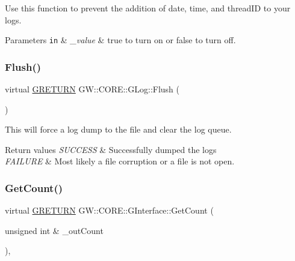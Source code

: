 Use this function to prevent the addition of date, time, and thread\+ID to your logs.


\begin{DoxyParams}[1]{Parameters}
\mbox{\tt in}  & {\em \+\_\+value} & true to turn on or false to turn off. \\
\hline
\end{DoxyParams}
\hypertarget{class_g_w_1_1_c_o_r_e_1_1_g_log_a1e0bb42d95ddd42fa019d5cd6050ff97}{}\label{class_g_w_1_1_c_o_r_e_1_1_g_log_a1e0bb42d95ddd42fa019d5cd6050ff97} 
\subsubsection{\texorpdfstring{Flush()}{Flush()}}
{\footnotesize\ttfamily virtual \hyperlink{namespace_g_w_a69b1aaebac1cac8049825f035884c95b}{G\+R\+E\+T\+U\+RN} G\+W\+::\+C\+O\+R\+E\+::\+G\+Log\+::\+Flush (\begin{DoxyParamCaption}{ }\end{DoxyParamCaption})\hspace{0.3cm}{\ttfamily [pure virtual]}}

This will force a log dump to the file and clear the log queue.


\begin{DoxyRetVals}{Return values}
{\em S\+U\+C\+C\+E\+SS} & Successfully dumped the logs \\
\hline
{\em F\+A\+I\+L\+U\+RE} & Most likely a file corruption or a file is not open. \\
\hline
\end{DoxyRetVals}
\hypertarget{class_g_w_1_1_c_o_r_e_1_1_g_interface_a80f212dcdf60202cf9da49405863d1d5}{}\label{class_g_w_1_1_c_o_r_e_1_1_g_interface_a80f212dcdf60202cf9da49405863d1d5} 
\subsubsection{\texorpdfstring{Get\+Count()}{GetCount()}}
{\footnotesize\ttfamily virtual \hyperlink{namespace_g_w_a69b1aaebac1cac8049825f035884c95b}{G\+R\+E\+T\+U\+RN} G\+W\+::\+C\+O\+R\+E\+::\+G\+Interface\+::\+Get\+Count (\begin{DoxyParamCaption}\item[{unsigned int \&}]{\+\_\+out\+Count }\end{DoxyParamCaption})\hspace{0.3cm}{\ttfamily [pure virtual]}, {\ttfamily [inherited]}}


